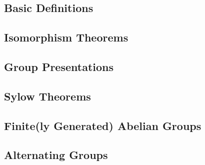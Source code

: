 \documentclass{article}
\begin{document}
  \begin{multicols}{2}
    \noindent\subsection*{Basic Definitions}
    
    
    
    
    \subsection*{Isomorphism Theorems}
    
    
    
    \subsection*{Group Presentations}
    
    
    \subsection*{Sylow Theorems}
    
    
    
    \subsection*{Finite(ly Generated) Abelian Groups}
    
    
    
    \subsection*{Alternating Groups}
    
    
    

\end{multicols}
\end{document}
